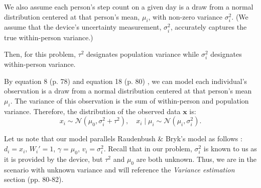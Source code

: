 \documentclass[letterpaper, 11pt]{extarticle}
\begin{document}
We also assume each person's step count on a given day is a draw from a normal distribution centered at that person's mean, $\mu_i$, with non-zero variance $\sigma_i^2$. (We assume that the device's uncertainty measurement, $\sigma_i^2$, accurately captures the true within-person variance.)

Then, for this problem, $\tau^2$ designates population variance while $\sigma_i^2$ designates within-person variance. 

By equation 8 (p. 78) and equation 18 (p. 80) \cite{doi:10.3102/10769986010002075}, we can model each individual's observation is a draw from a normal distribution centered at that person's mean $\mu_i$. The variance of this observation is the sum of within-person and population variance. Therefore, the distribution of the observed data $\textbf{x}$ is:
$$x_i \sim \mathcal{N}(\mu_0, \sigma_i^2+\tau^2), \quad x_i \mid \mu_i \sim \mathcal{N}(\mu_i, \sigma_i^2).$$

Let us note that our model parallels Raudenbush \& Bryk's model as follows \cite{doi:10.3102/10769986010002075}: $d_i = x_i$, $W_i' = 1$, $\gamma = \mu_0$, $v_i = \sigma_i^2$. Recall that in our problem, $\sigma_i^2$ is known to us as it is provided by the device, but $\tau^2$ and $\mu_0$ are both unknown. Thus, we are in the scenario with unknown variance and will reference the \textit{Variance estimation} section (pp. 80-82). 
\end{document}
